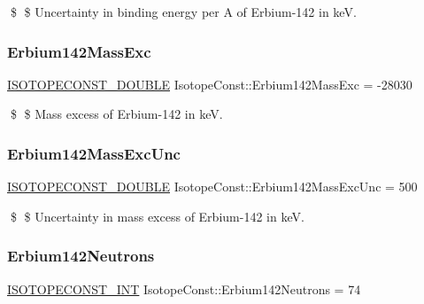 \$ \$ Uncertainty in binding energy per A of Erbium-\/142 in keV. \mbox{\label{group___isotope_const-_erbium-_er142_ga01815e81c0f800230d2452f43c7fb535}} 
\subsubsection{\texorpdfstring{Erbium142\+Mass\+Exc}{Erbium142MassExc}}
{\footnotesize\ttfamily \mbox{\hyperlink{group___isotope_const-_macros_ga8f45a7272ce02c0b4c65c44636ed719a}{I\+S\+O\+T\+O\+P\+E\+C\+O\+N\+S\+T\+\_\+\+D\+O\+U\+B\+LE}} Isotope\+Const\+::\+Erbium142\+Mass\+Exc = -\/28030}

\$ \$ Mass excess of Erbium-\/142 in keV. \mbox{\label{group___isotope_const-_erbium-_er142_gaf9942589a207cf7dd2f406f0e082fddb}} 
\subsubsection{\texorpdfstring{Erbium142\+Mass\+Exc\+Unc}{Erbium142MassExcUnc}}
{\footnotesize\ttfamily \mbox{\hyperlink{group___isotope_const-_macros_ga8f45a7272ce02c0b4c65c44636ed719a}{I\+S\+O\+T\+O\+P\+E\+C\+O\+N\+S\+T\+\_\+\+D\+O\+U\+B\+LE}} Isotope\+Const\+::\+Erbium142\+Mass\+Exc\+Unc = 500}

\$ \$ Uncertainty in mass excess of Erbium-\/142 in keV. \mbox{\label{group___isotope_const-_erbium-_er142_ga522341bd14a16dbfac8cb39df5e7f757}} 
\subsubsection{\texorpdfstring{Erbium142\+Neutrons}{Erbium142Neutrons}}
{\footnotesize\ttfamily \mbox{\hyperlink{group___isotope_const-_macros_ga5f18360b3e99483a35c32d789e62621c}{I\+S\+O\+T\+O\+P\+E\+C\+O\+N\+S\+T\+\_\+\+I\+NT}} Isotope\+Const\+::\+Erbium142\+Neutrons = 74}

